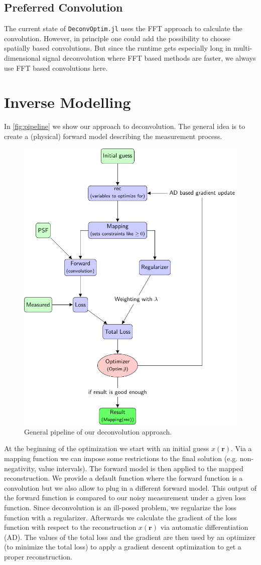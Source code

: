 \documentclass{juliacon}
\begin{document}
\subsection{Preferred Convolution}
The current state of \verb|DeconvOptim.jl| uses the FFT approach to calculate the convolution.
However, in principle one could add the possibility to choose spatially based convolutions.
But since the runtime gets especially long in multi-dimensional signal deconvolution where FFT based methods
are faster, we always use FFT based convolutions here. 
   
\section{Inverse Modelling}
In \autoref{fig:pipeline} we show our approach to deconvolution.
The general idea is to create a (physical) forward model describing the measurement process.
\begin{figure}[h]
    \centering
    \includegraphics[width = .4\textwidth]{figures/pipeline.pdf}
    \caption{General pipeline of our deconvolution approach.}
    \label{fig:pipeline}
\end{figure}

At the beginning of the optimization we start with an initial guess $x(\mathbf r)$. 
Via a mapping function we can impose some restrictions to the final solution (e.g. non-negativity, value intervals).
The forward model is then applied to the mapped reconstruction. We provide a default function where 
the forward function is a convolution but we also allow to plug in a different forward model.
This output of the forward function is compared
to our noisy measurement under a given loss function.
Since deconvolution is an ill-posed problem, we regularize the loss function with a regularizer.
Afterwards we calculate the gradient of the loss function with respect to the reconstruction $x(\mathbf r)$ via automatic differentiation (AD).
The values of the total loss and the gradient are then used by an optimizer (to minimize the total loss) to apply a gradient descent optimization to get a proper reconstruction.\\
\end{document}
